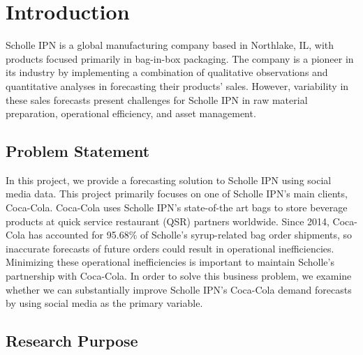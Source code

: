\documentclass[12pt,oneside]{chicagocapstone}
\begin{document}
  \hypersetup{linkcolor=black}
  \setcounter{tocdepth}{2}
  \tableofcontents

  \listoffigures

  \listoftables


\mainmatter %
\pagestyle{fancyplain} %

\hypertarget{introduction}{%
\chapter*{Introduction}\label{introduction}}

Scholle IPN is a global manufacturing company based in Northlake, IL, with products focused primarily in bag-in-box packaging. The company is a pioneer in its industry by implementing a combination of qualitative observations and quantitative analyses in forecasting their products' sales. However, variability in these sales forecasts present challenges for Scholle IPN in raw material preparation, operational efficiency, and asset management.

\hypertarget{problem-statement}{%
\section*{Problem Statement}\label{problem-statement}}

In this project, we provide a forecasting solution to Scholle IPN using social media data. This project primarily focuses on one of Scholle IPN's main clients, Coca-Cola. Coca-Cola uses Scholle IPN's state-of-the art bags to store beverage products at quick service restaurant (QSR) partners worldwide. Since 2014, Coca-Cola has accounted for 95.68\% of Scholle's syrup-related bag order shipments, so inaccurate forecasts of future orders could result in operational inefficiencies. Minimizing these operational inefficiencies is important to maintain Scholle's partnership with Coca-Cola. In order to solve this business problem, we examine whether we can substantially improve Scholle IPN's Coca-Cola demand forecasts by using social media as the primary variable.

\hypertarget{research-purpose}{%
\section*{Research Purpose}\label{research-purpose}}
\end{document}
